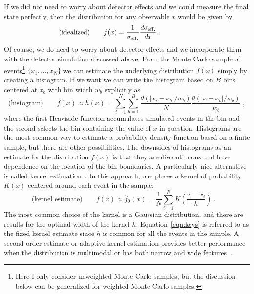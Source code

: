 If we did not need to worry about detector effects and we could measure the final state perfectly, then the distribution for any observable $x$ would be given by
\begin{equation}
\textrm{(idealized)}\hspace{2em}f(x) = \frac{1}{\sigma_{\rm eff.}} \frac{d\sigma_{\rm eff.}}{dx}\;.\hspace{5em}
\end{equation}
Of course, we do need to worry about detector effects and we incorporate them with the detector simulation discussed above.  From the Monte Carlo sample of events\footnote{Here I only consider unweighted Monte Carlo samples, but the discussion below can be generalized for weighted Monte Carlo samples.} $\{x_1, \dots, x_N\}$ we can estimate the underlying distribution $f(x)$ simply by creating a histogram.  If we want we can write the histogram based on $B$ bins centered at $x_b$ with bin width $w_b$ explicitly as
\begin{equation}
\textrm{(histogram)} \hspace{2em}f(x) \approx h(x) =  \sum_{i=1}^N \sum_{b=1}^B  \frac{ \theta(|x_i-x_b|/w_b) }{N} \frac{\theta(|x -x_b|/w_b)}{w_b}\;,  \end{equation}
where the first Heaviside function accumulates simulated events in the bin and the second selects the bin containing the value of $x$ in question.  Histograms are the most common way to estimate a probability density function based on a finite sample, but there are other possibilities.  The downsides of histograms as an estimate for the distribution $f(x)$ is that they are discontinuous and have dependence on the location of the bin boundaries.  A particularly nice alternative is called kernel estimation~\cite{Cranmer:2000du}.  In this approach, one places a kernel of probability $K(x)$ centered around each event in the sample:
\begin{equation}
\textrm{(kernel estimate)}\hspace{2em}f(x) \approx \hat{f}_0(x) =  \frac{1}{N} \sum_{i=1}^N K\left( \frac{x-x_i}{h} \right)\;.\hspace{1em}
\end{equation}
The most common choice of the kernel is a Gaussian distribution, and there are results for the optimal width of the kernel $h$.  Equation~\ref{eqn:keys} is referred to as the fixed kernel estimate since $h$ is common for all the events in the sample.  A second order estimate or adaptive kernel estimation provides better performance when the distribution is multimodal or has both narrow and wide features~\cite{Cranmer:2000du}.



